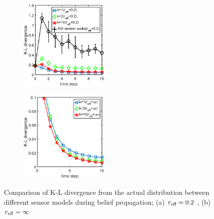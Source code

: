 \documentclass[letterpaper, 10 pt, conference]{ieeeconf}
\begin{document}
\begin{figure}
	\centering
	\begin{subfigure}[b]{0.23\textwidth}
		\centering
		\includegraphics[width=1.7in]{figure/kl_div_2_n}
		\caption{}
	\end{subfigure}
	\begin{subfigure}[b]{0.23\textwidth}
		\centering
		\includegraphics[width=1.7in]{figure/kl_div_1_n}
		\caption{}
	\end{subfigure}
	\caption{Comparison of K-L divergence from the actual distribution between different sensor models during belief propagation; (a) $r_{\textup{eff}} =0.2$ , (b) $r_{\textup{eff}}=\infty$}
	\label{fig:fig5}
\end{figure}
\end{document}
